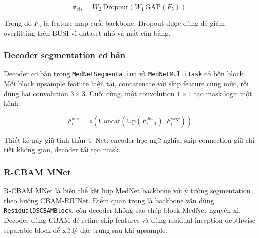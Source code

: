 \documentclass[12pt,a4paper]{article}
\begin{document}
\[
\mathbf{z}_{cls}
= W_2 \, \mathrm{Dropout}\left(W_1 \, \mathrm{GAP}(F_5)\right)
\]

Trong đó \(F_5\) là feature map cuối backbone. Dropout được dùng để giảm overfitting trên BUSI vì dataset nhỏ và mất cân bằng.

\subsubsection*{Decoder segmentation cơ bản}

Decoder cơ bản trong \texttt{MedNetSegmentation} và \texttt{MedNetMultiTask} có bốn block. Mỗi block upsample feature hiện tại, concatenate với skip feature cùng mức, rồi dùng hai convolution \(3 \times 3\). Cuối cùng, một convolution \(1 \times 1\) tạo mask logit một kênh.

\[
F^{dec}_{i}
= \phi\left(
\mathrm{Concat}(
\mathrm{Up}(F^{dec}_{i+1}), F^{skip}_{i})
\right)
\]

Thiết kế này giữ tinh thần U-Net: encoder học ngữ nghĩa, skip connection giữ chi tiết không gian, decoder tái tạo mask.

\subsubsection*{R-CBAM MNet}

R-CBAM MNet là biến thể kết hợp MedNet backbone với ý tưởng segmentation theo hướng CBAM-RIUNet. Điểm quan trọng là backbone vẫn dùng \texttt{ResidualDSCBAMBlock}, còn decoder không sao chép block MedNet nguyên xi. Decoder dùng CBAM để refine skip features và dùng residual inception depthwise separable block để xử lý đặc trưng sau khi upsample.
\end{document}
